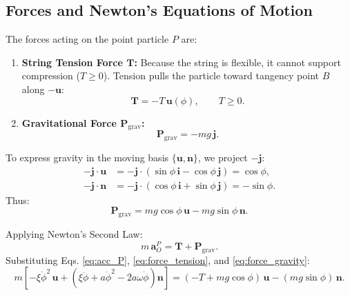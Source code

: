 \documentclass[11pt,a4paper]{article}
\begin{document}
\subsection{Forces and Newton's Equations of Motion}
The forces acting on the point particle $P$ are:
\begin{enumerate}
    \item \textbf{String Tension Force $\mathbf{T}$:} Because the string is flexible, it cannot support compression ($T \ge 0$). Tension pulls the particle toward tangency point $B$ along $-\mathbf{u}$:
    \begin{equation}
        \label{eq:force_tension}
        \mathbf{T} = -T\,\mathbf{u}(\phi), \qquad T \ge 0.
    \end{equation}
    \item \textbf{Gravitational Force $\mathbf{P}_{\text{grav}}$:}
    \begin{equation}
        \mathbf{P}_{\text{grav}} = -m g\,\mathbf{j}.
    \end{equation}
\end{enumerate}
To express gravity in the moving basis $\{\mathbf{u}, \mathbf{n}\}$, we project $-\mathbf{j}$:
\begin{align}
    -\mathbf{j} \cdot \mathbf{u} &= -\mathbf{j} \cdot (\sin\phi\,\mathbf{i} - \cos\phi\,\mathbf{j}) = \cos\phi, \\
    -\mathbf{j} \cdot \mathbf{n} &= -\mathbf{j} \cdot (\cos\phi\,\mathbf{i} + \sin\phi\,\mathbf{j}) = -\sin\phi.
\end{align}
Thus:
\begin{equation}
    \label{eq:force_gravity}
    \mathbf{P}_{\text{grav}} = m g\cos\phi\,\mathbf{u} - m g\sin\phi\,\mathbf{n}.
\end{equation}

Applying Newton's Second Law:
\begin{equation}
    m\,\mathbf{a}_O^P = \mathbf{T} + \mathbf{P}_{\text{grav}}.
\end{equation}
Substituting Eqs. \eqref{eq:acc_P}, \eqref{eq:force_tension}, and \eqref{eq:force_gravity}:
\begin{equation}
    \label{eq:newton_vector}
    m\left[-\xi\dot{\phi}^2\,\mathbf{u} + \left(\xi\ddot{\phi} + a\dot{\phi}^2 - 2a\omega\dot{\phi}\right)\mathbf{n}\right] = (-T + m g\cos\phi)\,\mathbf{u} - (m g\sin\phi)\,\mathbf{n}.
\end{equation}
\end{document}
